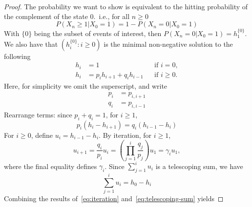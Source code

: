 \documentclass[
  coursecode={MTHE 455},
  assignmentname={Assignment \assignmentnumber},
  studentnumber=20053722,
  name={Bryan Hoang},
]{
  ltxanswer%
}
\begin{document}
  \begin{questions}
    \setcounter{question}{\questionnumber}
    \addtocounter{question}{-1}
    \question[7]{}
    \begin{solution}
      \begin{proof}
        The probability we want to show is equivalent to the hitting probability of the complement of the state 0.\ i.e., for all \(n \ge 0\)
        \begin{equation}\label{eq:probability}
          P(X_{n} \ge 1 | X_{0} = 1) = 1 - P(X_{n} = 0 | X_{0} = 1)
        \end{equation}
        With \(\{0\}\) being the subset of events of interest, then \(P(X_{n} = 0 | X_{0} = 1) = h_{1}^{\{0\}}\). We also have that \((h_{i}^{\{0\}} : i \ge 0)\) is the minimal non-negative solution to the following
        \begin{align*}
          h_{i} &= 1                           & &\text{if } i = 0,   \\
          h_{i} &= p_{i}h_{i+1} + q_{i}h_{i-1} & &\text{if } i \ge 0.
        \end{align*}
        Here, for simplicity we omit the superscript, and write
        \begin{equation}\label{eq:transition-probabilities}
          \begin{aligned}
            p_{i} & = p_{i,i+1} \\
            q_{i} & = p_{i,i-1}
          \end{aligned}
        \end{equation}
        Rearrange terms: since \(p_{i} + q_{i} = 1\), for \(i \ge 1\),
        \begin{equation*}
          p_{i}(h_{i}-h_{i+1}) = q_{i}(h_{i-1}-h_{i})
        \end{equation*}
        For \(i \ge 0\), define \(u_{i} = h_{i-1} - h_{i}\). By iteration, for \(i \ge 1\),
        \begin{equation}\label{eq:iteration}
          u_{i+1} = \frac{q_{i}}{p_{i}}u_{i} = \left(\prod_{j=1}^{i} \frac{q_{j}}{p_{j}}\right)u_{1} = \gamma_{i}u_{1},
        \end{equation}
        where the final equality defines \(\gamma_{i}\). Since \(\sum_{j=1}^{i} u_{i}\) is a telescoping sum, we have
        \begin{equation}\label{eq:telescoping-sum}
          \sum_{j=1}^{i} u_{i} = h_{0} - h_{i}
        \end{equation}
        Combining the results of~\eqref{eq:iteration} and~\eqref{eq:telescoping-sum} yields

\end{proof}
\end{solution}
\end{questions}
\end{document}
